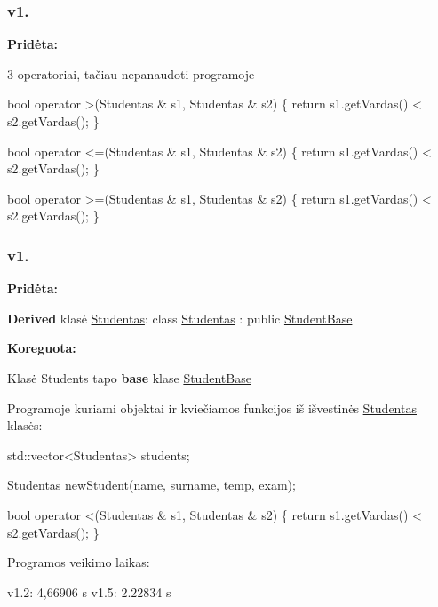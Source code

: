 \subsubsection*{v1.}

{\bfseries Pridėta\+:}


\begin{DoxyItemize}
\item 3 operatoriai, tačiau nepanaudoti programoje 
\begin{DoxyCode}
bool operator >(Studentas & s1, Studentas & s2)
\{
    return s1.getVardas() < s2.getVardas();
\}
\end{DoxyCode}
 
\begin{DoxyCode}
bool operator <=(Studentas & s1, Studentas & s2)
\{
    return s1.getVardas() < s2.getVardas();
\}
\end{DoxyCode}
 
\begin{DoxyCode}
bool operator >=(Studentas & s1, Studentas & s2)
\{
    return s1.getVardas() < s2.getVardas();
\}
\end{DoxyCode}

\end{DoxyItemize}

\subsubsection*{v1.}

{\bfseries Pridėta\+:}


\begin{DoxyItemize}
\item {\bfseries Derived} klasė {\ttfamily \hyperlink{classStudentas}{Studentas}}\+: {\ttfamily class \hyperlink{classStudentas}{Studentas} \+: public \hyperlink{classStudentBase}{Student\+Base}}
\end{DoxyItemize}

{\bfseries Koreguota\+:}


\begin{DoxyItemize}
\item Klasė {\ttfamily Students} tapo {\bfseries base} klase {\ttfamily \hyperlink{classStudentBase}{Student\+Base}}
\item Programoje kuriami objektai ir kviečiamos funkcijos iš išvestinės {\ttfamily \hyperlink{classStudentas}{Studentas}} klasės\+: 
\begin{DoxyCode}
std::vector<Studentas> students;

Studentas newStudent(name, surname, temp, exam);

bool operator <(Studentas & s1, Studentas & s2)
\{
    return s1.getVardas() < s2.getVardas();
\}
\end{DoxyCode}

\item Programos veikimo laikas\+: 
\begin{DoxyCode}
v1.2: 4,66906 s
v1.5: 2.22834 s
\end{DoxyCode}

\end{DoxyItemize}

